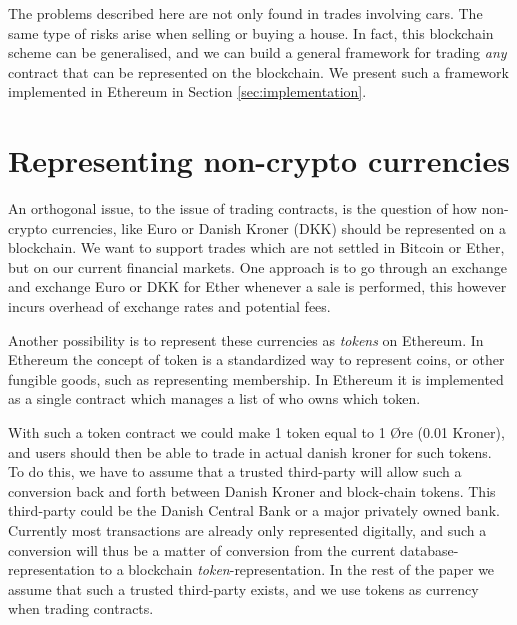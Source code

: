 \documentclass[oneside,a4paper,10pts,article]{memoir}
\begin{document}
The problems described here are not only found in trades involving
cars. The same type of risks arise when selling or buying a house. In
fact, this blockchain scheme can be generalised, and we can build a
general framework for trading \textit{any} contract that can be
represented on the blockchain. We present such a framework implemented
in Ethereum in Section \ref{sec:implementation}.



\chapter{Representing non-crypto currencies}
\label{sec:currency}
An orthogonal issue, to the issue of trading contracts, is the
question of how non-crypto currencies, like Euro or Danish Kroner
(DKK) should be represented on a blockchain. We want to support trades
which are not settled in Bitcoin or Ether, but on our current
financial markets. One approach is to go through an exchange and
exchange Euro or DKK for Ether whenever a sale is performed, this
however incurs overhead of exchange rates and potential fees.

Another possibility is to represent these currencies as
\textit{tokens} on Ethereum. In Ethereum the concept of token is a
standardized way to represent coins, or other fungible goods, such as
representing membership. In Ethereum it is implemented as a single
contract which manages a list of who owns which token.

With such a token contract we could make 1 token equal to 1 Øre (0.01
Kroner), and users should then be able to trade in actual danish
kroner for such tokens. To do this, we have to assume that a trusted
third-party will allow such a conversion back and forth between Danish
Kroner and block-chain tokens. This third-party could be the Danish
Central Bank or a major privately owned bank. Currently most
transactions are already only represented digitally, and such a
conversion will thus be a matter of conversion from the current
database-representation to a blockchain
\emph{token}-representation. In the rest of the paper we assume that
such a trusted third-party exists, and we use tokens as currency when
trading contracts.
\end{document}
